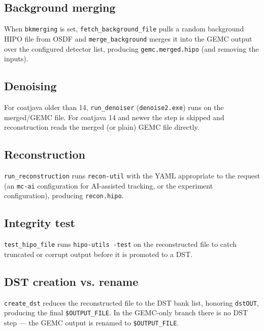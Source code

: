 \subsection{Background merging}

When \texttt{bkmerging} is set, \texttt{fetch\_\allowbreak{}background\_\allowbreak{}file} pulls a random
background HIPO file from OSDF and \texttt{merge\_\allowbreak{}background} merges it into the GEMC output over
the configured detector list, producing \texttt{gemc.\allowbreak{}merged.\allowbreak{}hipo} (and removing the
inputs).

\subsection{Denoising}

For coatjava older than 14, \texttt{run\_\allowbreak{}denoiser} (\texttt{denoise2.\allowbreak{}exe}) runs on
the merged/GEMC file. For coatjava 14 and newer the step is skipped and reconstruction reads the merged (or
plain) GEMC file directly.

\subsection{Reconstruction}

\texttt{run\_\allowbreak{}reconstruction} runs \texttt{recon-\allowbreak{}util} with the YAML appropriate to
the request (an \texttt{mc-\allowbreak{}ai} configuration for AI-assisted tracking, or the experiment
configuration), producing \texttt{recon.\allowbreak{}hipo}.

\subsection{Integrity test}

\texttt{test\_\allowbreak{}hipo\_\allowbreak{}file} runs \texttt{hipo-\allowbreak{}utils -\allowbreak{}test} on
the reconstructed file to catch truncated or corrupt output before it is promoted to a DST.

\subsection{DST creation vs. rename}

\texttt{create\_\allowbreak{}dst} reduces the reconstructed file to the DST bank list, honoring
\texttt{dstOUT}, producing the final \texttt{\$OUTPUT\_\allowbreak{}FILE}. In the GEMC-only branch there is no
DST step --- the GEMC output is renamed to \texttt{\$OUTPUT\_\allowbreak{}FILE}.


